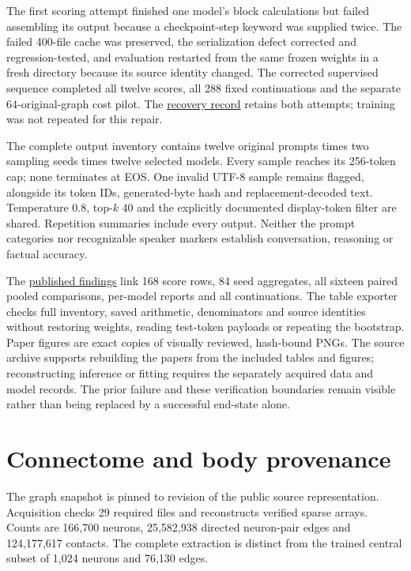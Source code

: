 \documentclass[10pt]{article}
\begin{document}
The first scoring attempt finished one model's block calculations but failed
assembling its output because a checkpoint-step keyword was supplied twice.
The failed 400-file cache was preserved, the serialization defect corrected
and regression-tested, and evaluation restarted from the same frozen weights
in a fresh directory because its source identity changed. The corrected
supervised sequence completed all twelve scores, all 288 fixed continuations
and the separate 64-original-graph cost pilot. The
\href{https://flm.kuber.studio/research/babylm-handoff.md}{recovery record}
retains both attempts; training was not repeated for this repair.

The complete output inventory contains twelve original prompts times two
sampling seeds times twelve selected models. Every sample reaches its
256-token cap; none terminates at EOS. One invalid UTF-8 sample remains
flagged, alongside its token IDs, generated-byte hash and replacement-decoded
text. Temperature 0.8, top-$k$ 40 and the explicitly documented display-token
filter are shared. Repetition summaries include every output. Neither the
prompt categories nor recognizable speaker markers establish conversation,
reasoning or factual accuracy.

The \href{https://flm.kuber.studio/research/babylm-findings.md}{published findings}
link 168 score rows, 84 seed aggregates, all sixteen paired pooled comparisons,
per-model reports and all continuations. The table exporter checks full
inventory, saved arithmetic, denominators and source identities without
restoring weights, reading test-token payloads or repeating the bootstrap.
Paper figures are exact copies of visually reviewed, hash-bound PNGs. The
source archive supports rebuilding the papers from the included tables and
figures; reconstructing inference or fitting requires the separately acquired
data and model records. The prior failure and these verification boundaries
remain visible rather than being replaced by a successful end-state alone.

\section{Connectome and body provenance}
The graph snapshot is pinned to revision  of the public source representation. Acquisition checks 29 required files and reconstructs verified sparse arrays. Counts are 166,700 neurons, 25,582,938 directed neuron-pair edges and 124,177,617 contacts. The complete extraction is distinct from the trained central subset of 1,024 neurons and 76,130 edges.
\end{document}

